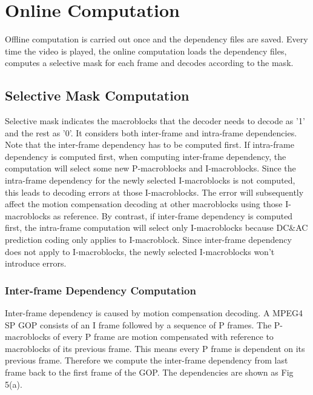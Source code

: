 \section{Online Computation}
Offline computation is carried out once and the dependency files are saved. Every time the video is played, the online computation loads the dependency files, computes a selective mask for each frame and decodes according to the mask.

\subsection{Selective Mask Computation}
Selective mask indicates the macroblocks that the decoder needs to decode as '1' and the rest as '0'. It considers both inter-frame and intra-frame dependencies. Note that the inter-frame dependency has to be computed first. If intra-frame dependency is computed first, when computing inter-frame dependency, the computation will select some new P-macroblocks and I-macroblocks. Since the intra-frame dependency for the newly selected I-macroblocks is not computed, this leads to decoding errors at those I-macroblocks. The error will subsequently affect the motion compensation decoding at other macroblocks using those I-macroblocks as reference. By contrast, if inter-frame dependency is computed first, the intra-frame computation will select only I-macroblocks because DC\&AC prediction coding only applies to I-macroblock. Since inter-frame dependency does not apply to I-macroblocks, the newly selected I-macroblocks won't introduce errors. 

\subsubsection{Inter-frame Dependency Computation}
Inter-frame dependency is caused by motion compensation decoding. A MPEG4 SP GOP consists of an I frame followed by a sequence of P frames. The P-macroblocks of every P frame are motion compensated with reference to macroblocks of its previous frame. This means every P frame is dependent on its previous frame. Therefore we compute the inter-frame dependency from last frame back to the first frame of the GOP. The dependencies are shown as Fig 5(a).
 
